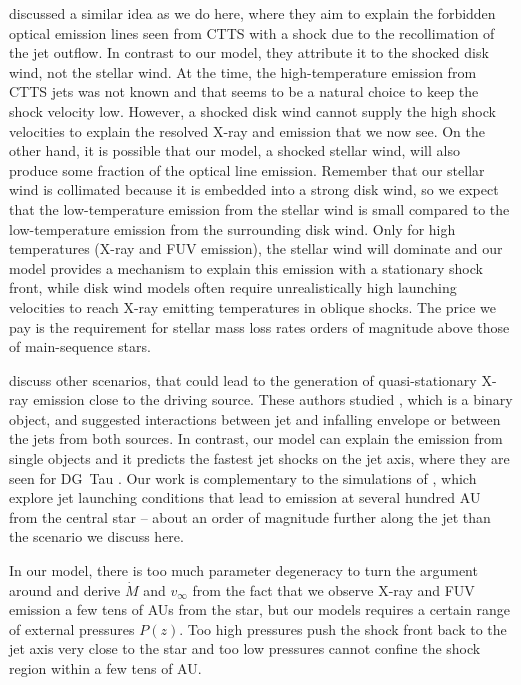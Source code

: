 \citet{1993ApJ...409..748G} discussed a similar idea as we do here, where they aim to explain the forbidden optical emission lines seen from CTTS with a shock due to the recollimation of the jet outflow. In contrast to our model, they attribute it to the shocked disk wind, not the stellar wind. At the time, the high-temperature emission from CTTS jets was not known and that seems to be a natural choice to keep the shock velocity low. However, a shocked disk wind cannot supply the high shock velocities to explain the resolved X-ray and  emission that we now see. On the other hand, it is possible that our model, a shocked stellar wind, will also produce some fraction of the optical line emission.
Remember that our stellar wind is collimated because it is embedded into a strong disk wind, so we expect that the low-temperature emission from the stellar wind is small compared to the low-temperature emission from the surrounding disk wind. Only for high temperatures (X-ray and FUV emission), the stellar wind will dominate and our model provides a mechanism to explain this emission with a stationary shock front, while disk wind models often require unrealistically high launching velocities to reach X-ray emitting temperatures in oblique shocks. The price we pay is the requirement for stellar mass loss rates orders of magnitude above those of main-sequence stars.

\citet{2003ApJ...584..843B} discuss other scenarios, that could lead to the generation of quasi-stationary X-ray emission close to the driving source. These authors studied , which is a binary object, and suggested interactions between jet and infalling envelope or between the jets from both sources. In contrast, our model can explain the emission from single objects and it predicts the fastest jet shocks on the jet axis, where they are seen for DG~Tau \citep{2013A&A...550L...1S}. Our work is complementary to the simulations of \citet{2010A&A...511A..42B,2010A&A...517A..68B,2011ApJ...737...54B}, which explore jet launching conditions that lead to emission at several hundred AU from the central star -- about an order of magnitude further along the jet than the scenario we discuss here.

In our model, there is too much parameter degeneracy to turn the argument around and derive $\dot M$ and  $v_\infty$ from the fact that we observe X-ray and FUV emission a few tens of AUs from the star, but our models requires a certain range of external pressures $P(z)$. Too high pressures push the shock front back to the jet axis very close to the star and too low pressures cannot confine the shock region within a few tens of AU.

